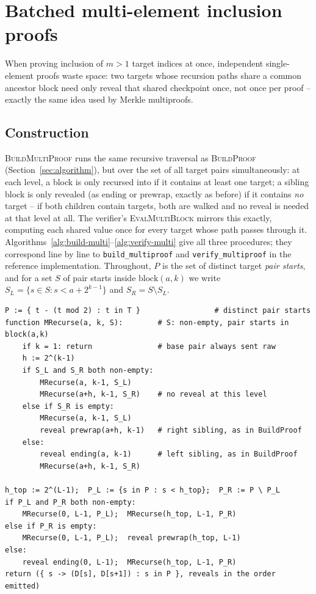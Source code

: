 \section{Batched multi-element inclusion proofs}
\label{sec:multiproof}

When proving inclusion of $m > 1$ target indices at once, independent
single-element proofs waste space: two targets whose recursion paths share
a common ancestor block need only reveal that shared checkpoint once, not
once per proof -- exactly the same idea used by Merkle multiproofs.

\subsection{Construction}

\textsc{BuildMultiProof} runs the same recursive traversal as
\textsc{BuildProof} (Section~\ref{sec:algorithm}), but over the set of all
target pairs simultaneously: at each level, a block is only recursed into
if it contains at least one target; a sibling block is only revealed (as
$\mathrm{ending}$ or $\mathrm{prewrap}$, exactly as before) if it contains
\emph{no} target -- if both children contain targets, both are walked and
no reveal is needed at that level at all. The verifier's
\textsc{EvalMultiBlock} mirrors this exactly, computing each shared value
once for every target whose path passes through it.
Algorithms~\ref{alg:build-multi}--\ref{alg:verify-multi} give all three
procedures; they correspond line by line to \texttt{build\_multiproof}
and \texttt{verify\_multiproof} in the reference implementation.
Throughout, $P$ is the set of distinct target \emph{pair starts}, and for
a set $S$ of pair starts inside $\mathrm{block}(a,k)$ we write $S_L = \{s
\in S : s < a + 2^{k-1}\}$ and $S_R = S \setminus S_L$.

\begin{algorithm}[H]
\caption{$\textsc{BuildMultiProof}(T)$ -- prover}
\label{alg:build-multi}
\begin{lstlisting}[style=pseudo]
P := { t - (t mod 2) : t in T }                 # distinct pair starts
function MRecurse(a, k, S):        # S: non-empty, pair starts in block(a,k)
    if k = 1: return               # base pair always sent raw
    h := 2^(k-1)
    if S_L and S_R both non-empty:
        MRecurse(a, k-1, S_L)
        MRecurse(a+h, k-1, S_R)    # no reveal at this level
    else if S_R is empty:
        MRecurse(a, k-1, S_L)
        reveal prewrap(a+h, k-1)   # right sibling, as in BuildProof
    else:
        reveal ending(a, k-1)      # left sibling, as in BuildProof
        MRecurse(a+h, k-1, S_R)

h_top := 2^(L-1);  P_L := {s in P : s < h_top};  P_R := P \ P_L
if P_L and P_R both non-empty:
    MRecurse(0, L-1, P_L);  MRecurse(h_top, L-1, P_R)
else if P_R is empty:
    MRecurse(0, L-1, P_L);  reveal prewrap(h_top, L-1)
else:
    reveal ending(0, L-1);  MRecurse(h_top, L-1, P_R)
return ({ s -> (D[s], D[s+1]) : s in P }, reveals in the order emitted)
\end{lstlisting}
\end{algorithm}

